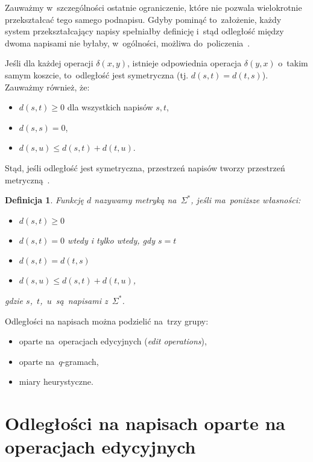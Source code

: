 \documentclass[12pt, twoside, openany]{report}
\theoremstyle{plain}
\newtheorem{defi}{Definicja}[section]
\begin{document}
Zauważmy w~szczególności ostatnie ograniczenie, które nie pozwala wielokrotnie przekształcać tego samego podnapisu. Gdyby pominąć to~założenie, każdy system przekształcający napisy spełniałby definicję i~stąd odległość między dwoma napisami nie byłaby, w~ogólności, możliwa do~policzenia~\cite{Navarro2001:guidedtour}.

Jeśli dla każdej operacji $\delta(x,y)$, istnieje odpowiednia operacja $\delta(y,x)$ o~takim samym koszcie, to~odległość jest symetryczna (tj. $d(s,t) = d(t,s)$). Zauważmy również, że:
\begin{itemize}
\item $d(s,t) \geq 0$ dla wszystkich napisów $s, t$,
\item $d(s,s) = 0$,
\item $d(s,u) \leq d(s,t) + d(t,u)$.
\end{itemize}
Stąd, jeśli odległość jest symetryczna, przestrzeń napisów tworzy przestrzeń metryczną~\cite{Navarro2001:guidedtour}.

\begin{defi}
Funkcję $d$ nazywamy \emph{metryką} na~$\Sigma^*$, jeśli ma~poniższe własności:
\begin{itemize}
\item $d(s,t) \geq 0$
\item $d(s,t) = 0$ wtedy i tylko wtedy, gdy $s = t$
\item $d(s,t) = d(t,s)$
\item $d(s,u) \leq d(s,t) + d(t,u)$,
\end{itemize}
gdzie $s$,~$t$,~$u$~są~napisami z~$\Sigma^*$.
\end{defi}



Odległości na napisach można podzielić na~trzy grupy:
\begin{itemize}
\item oparte na~operacjach edycyjnych (\emph{edit operations}),
\item oparte na~$q$-gramach,
\item miary heurystyczne.
\end{itemize}


\section{Odległości na napisach oparte na operacjach edycyjnych}
\end{document}
